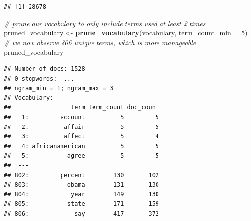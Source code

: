 \documentclass[12pt]{article}
\newenvironment{Shaded}{\begin{snugshade}}{\end{snugshade}}
\newcommand{\CommentTok}[1]{\textcolor[rgb]{0.56,0.35,0.01}{\textit{#1}}}
\newcommand{\DataTypeTok}[1]{\textcolor[rgb]{0.13,0.29,0.53}{#1}}
\newcommand{\DecValTok}[1]{\textcolor[rgb]{0.00,0.00,0.81}{#1}}
\newcommand{\KeywordTok}[1]{\textcolor[rgb]{0.13,0.29,0.53}{\textbf{#1}}}
\newcommand{\NormalTok}[1]{#1}
\newcommand{\OperatorTok}[1]{\textcolor[rgb]{0.81,0.36,0.00}{\textbf{#1}}}
\newcommand{\OtherTok}[1]{\textcolor[rgb]{0.56,0.35,0.01}{#1}}
\newcommand{\StringTok}[1]{\textcolor[rgb]{0.31,0.60,0.02}{#1}}
\begin{document}
\begin{Shaded}
\end{Shaded}

\begin{verbatim}
## [1] 28678
\end{verbatim}

\begin{Shaded}
\begin{Highlighting}[]
\CommentTok{# prune our vocabulary to only include terms used at least 2 times}
\NormalTok{pruned_vocabulary <-}\StringTok{ }\KeywordTok{prune_vocabulary}\NormalTok{(vocabulary, }\DataTypeTok{term_count_min =} \DecValTok{5}\NormalTok{)}
\CommentTok{# we now observe 806 unique terms, which is more manageable}
\NormalTok{pruned_vocabulary}
\end{Highlighting}
\end{Shaded}

\begin{verbatim}
## Number of docs: 1528 
## 0 stopwords:  ... 
## ngram_min = 1; ngram_max = 3 
## Vocabulary: 
##                 term term_count doc_count
##   1:         account          5         5
##   2:          affair          5         5
##   3:          affect          5         4
##   4: africanamerican          5         5
##   5:           agree          5         5
##  ---                                     
## 802:         percent        130       102
## 803:           obama        131       130
## 804:            year        149       130
## 805:           state        171       159
## 806:             say        417       372
\end{verbatim}
\end{document}
